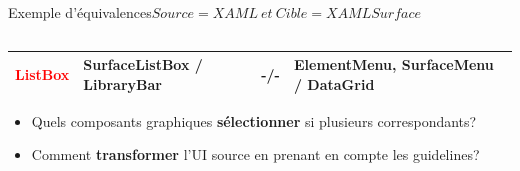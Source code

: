 \documentclass[11pt]{beamer}
\begin{document}
\begin{frame}[t]{Exemple d'équivalences}{\scriptsize $Source=XAML\  et\ Cible=XAMLSurface$}
\begin{columns}
\begin{column}{.82\textwidth}
\begin{table}[t]
\begin{tabularx}{9cm}{|Y|Y|Y|Y|}
			\hline \textcolor{red}{{\tiny ListBox}}
			& {\tiny SurfaceListBox / LibraryBar}
			& -/-
			& {\tiny ElementMenu, SurfaceMenu / DataGrid}\\
			\hline
		\end{tabularx}
	\end{table}
	\pause
	\begin{itemize}
		\item {\scriptsize Quels composants graphiques \textbf{sélectionner} si plusieurs correspondants?} 
		\item {\scriptsize Comment \textbf{transformer} l'UI source en prenant en compte les guidelines?}
	\end{itemize}
	\end{column}
\end{columns}
\end{frame}
\end{document}
